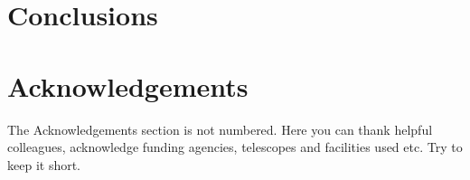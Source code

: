 \documentclass[a4paper,fleqn,usenatbib]{../mnras}
\begin{document}



\section{Conclusions}\label{sec:conclusions}
\section*{Acknowledgements}

The Acknowledgements section is not numbered. Here you can thank helpful
colleagues, acknowledge funding agencies, telescopes and facilities used etc.
Try to keep it short.





\end{document}
